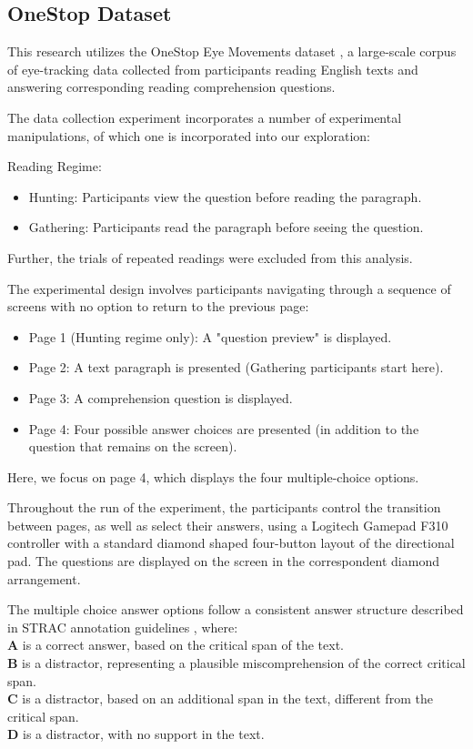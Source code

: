 \documentclass{article}
\begin{document}
    \subsection{OneStop Dataset}
    This research utilizes the OneStop Eye Movements dataset  \parencite{berzak2025onestop}, a large-scale corpus of eye-tracking data collected from participants reading English texts and answering corresponding reading comprehension questions.

    The data collection experiment incorporates a number of experimental manipulations, of which one is incorporated into our exploration:

    Reading Regime:
    \begin{itemize}
        \item Hunting: Participants view the question before reading the paragraph.
        \item Gathering: Participants read the paragraph before seeing the question.
    \end{itemize}

    Further, the trials of repeated readings were excluded from this analysis.
    \newline
    
    The experimental design involves participants navigating through a sequence of screens with no option to return to the previous page:
    \begin{itemize}
        \item Page 1 (Hunting regime only): A "question preview" is displayed.
        \item Page 2: A text paragraph is presented (Gathering participants start here).
        \item Page 3: A comprehension question is displayed.
        \item Page 4: Four possible answer choices are presented (in addition to the question that remains on the screen).
    \end{itemize}

    Here, we focus on page 4, which displays the four multiple-choice options.
    
    Throughout the run of the experiment, the participants control the transition between pages, as well as select their answers, using a Logitech Gamepad F310 controller with a standard diamond shaped four-button layout of the directional pad. The questions are displayed on the screen in the correspondent diamond arrangement.  

    The multiple choice answer options follow a consistent answer structure described in STRAC annotation guidelines \parencite{berzak2020starc}, where:\\
    \textbf{A} is a correct answer, based on the critical span of the text.\\
    \textbf{B} is a distractor, representing a plausible miscomprehension of the correct critical span. \\
    \textbf{C} is a distractor, based on an additional span in the text, different from the critical span. \\
    \textbf{D} is a distractor, with no support in the text.
    
\end{document}
